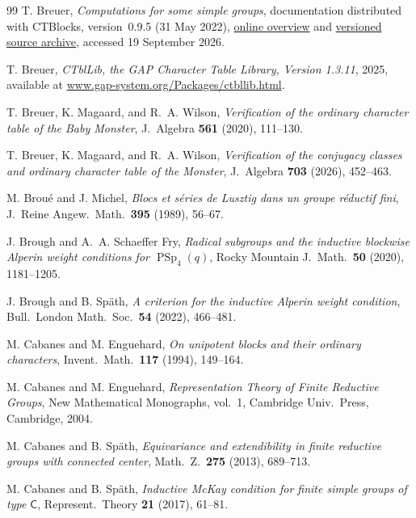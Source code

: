 \documentclass[10pt]{amsart}
\theoremstyle{definition}
\newcommand{\GAP}{\textsf{GAP}}
\numberwithin{equation}{section}
\numberwithin{table}{section}
\begin{document}
\begin{thebibliography}{99}
T. Breuer,
{\it Computations for some simple groups},
documentation distributed with CTBlocks, version~0.9.5 (31 May 2022),
\href{https://www.math.rwth-aachen.de/~Thomas.Breuer/ctblocks/doc/overview.html}
{online overview} and
\href{https://www.math.rwth-aachen.de/~Thomas.Breuer/ctblocks/ctblocks-0.9.5.tar.gz}
{versioned source archive}, accessed 19 September 2026.

T. Breuer,
{\it CTblLib, the \textup{\GAP} Character Table Library, Version 1.3.11},
2025, available at
\href{https://www.gap-system.org/Packages/ctbllib.html}
{www.gap-system.org/Packages/ctbllib.html}.

T. Breuer, K. Magaard, and R.~A. Wilson,
{\it Verification of the ordinary character table of the Baby Monster},
J.\ Algebra \textbf{561} (2020), 111--130.

T. Breuer, K. Magaard, and R.~A. Wilson,
{\it Verification of the conjugacy classes and ordinary character table of
the Monster},
J.\ Algebra \textbf{703} (2026), 452--463.

M. Brou\'e and J. Michel,
{\it Blocs et s\'eries de Lusztig dans un groupe r\'eductif fini},
J.\ Reine Angew.\ Math.\ \textbf{395} (1989), 56--67.

J. Brough and A.~A. Schaeffer Fry,
{\it Radical subgroups and the inductive blockwise Alperin weight
conditions for $\operatorname{PSp}_4(q)$},
Rocky Mountain J.\ Math.\ \textbf{50} (2020), 1181--1205.

J. Brough and B. Sp\"ath,
{\it A criterion for the inductive Alperin weight condition},
Bull.\ London Math.\ Soc.\ \textbf{54} (2022), 466--481.

M. Cabanes and M. Enguehard,
{\it On unipotent blocks and their ordinary characters},
Invent.\ Math.\ \textbf{117} (1994), 149--164.

M. Cabanes and M. Enguehard,
{\it Representation Theory of Finite Reductive Groups},
New Mathematical Monographs, vol.~1, Cambridge Univ.\ Press, Cambridge,
2004.

M. Cabanes and B. Sp\"ath,
{\it Equivariance and extendibility in finite reductive groups with
connected center},
Math.\ Z.\ \textbf{275} (2013), 689--713.

M. Cabanes and B. Sp\"ath,
{\it Inductive McKay condition for finite simple groups of type $\mathsf C$},
Represent.\ Theory \textbf{21} (2017), 61--81.


\end{thebibliography}
\end{document}
